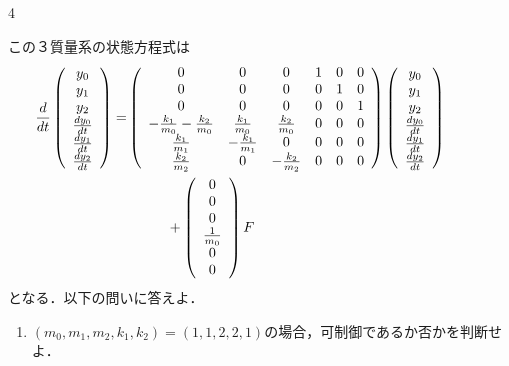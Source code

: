 \documentclass[fleqn]{article}
\begin{document}
\begin{multicols}{4}
\begin{enumerate}
この３質量系の状態方程式は
{\footnotesize
\begin{align*} 
\hspace*{-10mm}
 \frac{d}{dt} \left(\begin{array}{c}
	         y_0 \\
		     y_1 \\
		     y_2 \\
		     \frac{dy_0}{dt} \\
		     \frac{dy_1}{dt} \\
		     \frac{dy_2}{dt}
		    \end{array}\right)
 =&
 \left(\begin{array}{cccccc}
        0 & 0 & 0 & 1 & 0 & 0      \\
        0 & 0 & 0 & 0 & 1 & 0      \\
        0 & 0 & 0 & 0 & 0 & 1      \\
	-\frac{k_1}{m_0} -\frac{k_2}{m_0}&  \frac{k_1}{m_0} &  \frac{k_2}{m_0} & 0 & 0 & 0 \\
	 \frac{k_1}{m_1}                & -\frac{k_1}{m_1} &  0               & 0 & 0 & 0 \\
	 \frac{k_2}{m_2}                &  0               & -\frac{k_2}{m_2} & 0 & 0 & 0 
       \end{array}\right)
 \left(\begin{array}{c}
	         y_0 \\
		     y_1 \\
		     y_2 \\
		     \frac{dy_0}{dt} \\
		     \frac{dy_1}{dt} \\
		     \frac{dy_2}{dt}
       \end{array}\right)
\\
 &\hspace*{10mm} +
 \left(\begin{array}{c}
        0 \\
        0 \\
        0 \\
	    \frac{1}{m_0} \\
	    0 \\
	    0 
       \end{array}\right)
        F
\end{align*}
}
となる．以下の問いに答えよ．

\begin{enumerate}
\item 
$(m_0, m_1, m_2, k_1, k_2)=(1,1,2,2,1)$の場合，可制御であるか否かを判断せよ．
\vspace{8cm}
\vfill\null
\columnbreak


\end{enumerate}
\end{enumerate}
\end{multicols}
\end{document}
